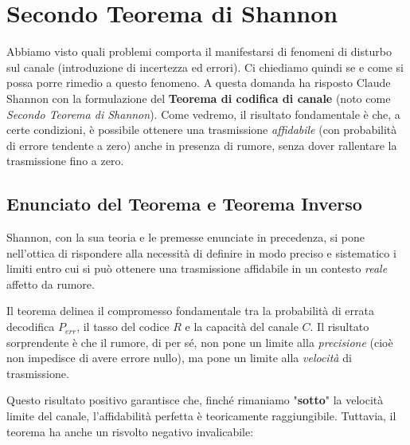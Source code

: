 \section{Secondo Teorema di Shannon}
Abbiamo visto quali problemi comporta il manifestarsi di fenomeni di disturbo sul canale (introduzione di incertezza ed errori). Ci chiediamo quindi se e come si possa porre rimedio a questo fenomeno.
A questa domanda ha risposto Claude Shannon con la formulazione del \textbf{Teorema di codifica di canale} (noto come \textit{Secondo Teorema di Shannon}).
Come vedremo, il risultato fondamentale è che, a certe condizioni, è possibile ottenere una trasmissione \textit{affidabile} (con probabilità di errore tendente a zero) anche in presenza di rumore, senza dover rallentare la trasmissione fino a zero.


\subsection{Enunciato del Teorema e Teorema Inverso}
Shannon, con la sua teoria e le premesse enunciate in precedenza, si pone nell'ottica di rispondere alla necessità di definire in modo preciso e sistematico i limiti entro cui si può ottenere una trasmissione affidabile in un contesto \textit{reale} affetto da rumore.

Il teorema delinea il compromesso fondamentale tra la probabilità di errata decodifica $P_{err}$, il tasso del codice $R$ e la capacità del canale $C$.
Il risultato sorprendente è che il rumore, di per sé, non pone un limite alla \textit{precisione} (cioè non impedisce di avere errore nullo), ma pone un limite alla \textit{velocità} di trasmissione.


Questo risultato positivo garantisce che, finché rimaniamo "\textbf{sotto}" la velocità limite del canale, l'affidabilità perfetta è teoricamente raggiungibile. Tuttavia, il teorema ha anche un risvolto negativo invalicabile:


